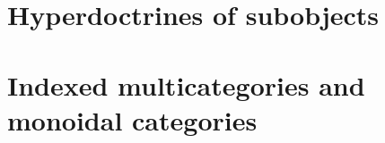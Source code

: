 
\newpage


\begin{rmk}\label{rmk:subset-quotient}
\end{rmk}


\section{Hyperdoctrines of subobjects}
\label{sec:sub}


\section{Indexed multicategories and monoidal categories}
\label{sec:indexed-moncat}

